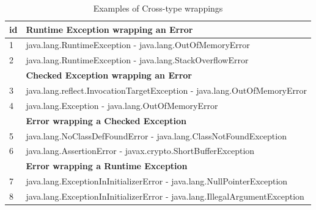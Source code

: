 \begin{table}
\scriptsize
\centering

\begin{tabular}{ll}
    \hline
 id & \bfseries{Runtime Exception wrapping an Error}    \\  %
    \hline
1 & java.lang.RuntimeException - java.lang.OutOfMemoryError  \\ %
2& java.lang.RuntimeException -  java.lang.StackOverflowError   \\ %
\hline
& \bfseries{Checked Exception wrapping an Error}  \\
 \hline
3&java.lang.reflect.InvocationTargetException - java.lang.OutOfMemoryError  \\ %
4&java.lang.Exception - java.lang.OutOfMemoryError   \\ %
\hline
& \bfseries{Error wrapping a Checked Exception}  \\
 \hline
5&java.lang.NoClassDefFoundError - java.lang.ClassNotFoundException   \\ %
6&java.lang.AssertionError - javax.crypto.ShortBufferException   \\ %
\hline
& \bfseries{Error wrapping a Runtime Exception}    \\
 \hline
7&java.lang.ExceptionInInitializerError - java.lang.NullPointerException   \\ %
8&java.lang.ExceptionInInitializerError - java.lang.IllegalArgumentException 	 \\ %
 \hline
  \end{tabular}
\caption{Examples of Cross-type wrappings}
\label{tab:exampeswrap}
\end{table}


